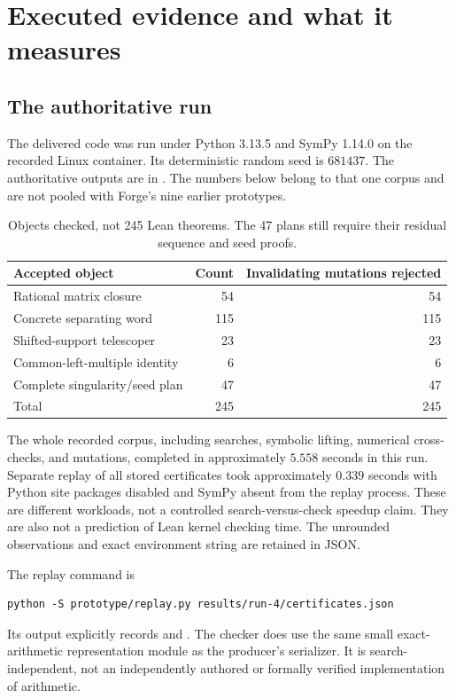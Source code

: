\section{Executed evidence and what it measures}
\label{sec:evidence}

\subsection{The authoritative run}

The delivered code was run under Python 3.13.5 and SymPy 1.14.0 on the recorded
Linux container. Its deterministic random seed is $681437$. The authoritative
outputs are in . The numbers below belong to that one
corpus and are not pooled with Forge's nine earlier prototypes.

\begin{table}[ht]
\centering
\begin{tabular}{@{}lrr@{}}
\toprule
Accepted object & Count & Invalidating mutations rejected\\
\midrule
Rational matrix closure & 54 & 54\\
Concrete separating word & 115 & 115\\
Shifted-support telescoper & 23 & 23\\
Common-left-multiple identity & 6 & 6\\
Complete singularity/seed plan & 47 & 47\\
\midrule
Total & 245 & 245\\
\bottomrule
\end{tabular}
\caption{Objects checked, not 245 Lean theorems. The 47 plans still require their residual sequence and seed proofs.}
\end{table}

The whole recorded corpus, including searches, symbolic lifting, numerical
cross-checks, and mutations, completed in approximately $5.558$ seconds in this
run. Separate replay of all stored certificates took approximately $0.339$
seconds with Python site packages disabled and SymPy absent from the replay
process. These are different workloads, not a controlled search-versus-check
speedup claim. They are also not a prediction of Lean kernel checking time.
The unrounded observations and exact environment string are retained in JSON.

The replay command is
\begin{lstlisting}
python -S prototype/replay.py results/run-4/certificates.json
\end{lstlisting}
Its output explicitly records  and
. The checker does use the same small exact-arithmetic
representation module as the producer's serializer. It is search-independent,
not an independently authored or formally verified implementation of arithmetic.

